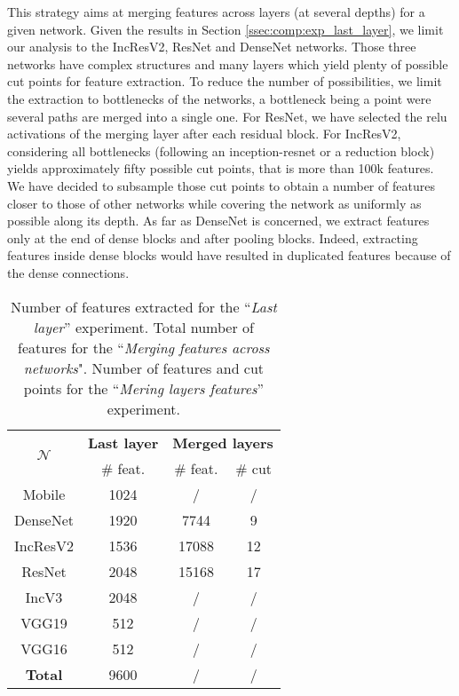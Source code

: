 This strategy aims at merging features across layers (at several depths) for a given network. Given the results in Section \ref{ssec:comp:exp_last_layer}, we limit our analysis to the IncResV2, ResNet and DenseNet networks. Those three networks have complex structures and many layers which yield plenty of possible cut points for feature extraction. To reduce the number of possibilities, we limit the extraction to bottlenecks of the networks, a bottleneck being a point were several paths are merged into a single one. For ResNet, we have selected the \acrshort{relu} activations of the merging layer after each residual block. For IncResV2, considering all bottlenecks (following an inception-resnet or a reduction block) yields approximately fifty possible cut points, that is more than 100k features. We have decided to subsample those cut points to obtain a number of features closer to those of other networks while covering the network as uniformly as possible along its depth. As far as DenseNet is concerned, we extract features only at the end of dense blocks and after pooling blocks. Indeed, extracting features inside dense blocks would have resulted in duplicated features because of the dense connections.  

\begin{table}
    \center 
    \begin{tabular}{|c|c|c|c|}
        \hline
        \multirow{2}{*}{$\mathcal{N}$} & \multicolumn{1}{c|}{\textbf{Last layer}} & \multicolumn{2}{c|}{\textbf{Merged layers}} \\
        \cline{2-4}
        & \# feat. & \# feat. & \# cut \\
        \hline
        Mobile & 1024 & / & /\\ 
        DenseNet & 1920 & 7744 & 9 \\ 
        IncResV2 & 1536 & 17088 & 12 \\ 
        ResNet & 2048 & 15168 & 17 \\ 
        IncV3 & 2048 & / & / \\ 
        VGG19 & 512 & / & / \\ 
        VGG16 & 512 & / & / \\  
        \hline
        \textbf{Total} & 9600 & / & / \\
        \hline 
    \end{tabular}
    \caption{Number of features extracted for the ``\textit{Last layer}'' experiment. Total number of features for the ``\textit{Merging features across networks}". Number of features and cut points for the ``\textit{Mering layers features}'' experiment.}
    \label{tab:comp:n_features_per_net}
\end{table}

